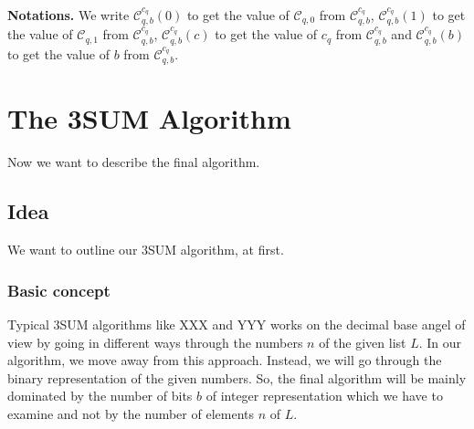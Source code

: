 \documentclass{article}
\newtheorem*{theorem A}{Theorem A}
\newtheorem*{theorem B}{N\"olker's Theorem}
\theoremstyle{remark}
\theoremstyle{remark}
\begin{document}
\textbf{Notations.} We write $\mathcal{C}^{c_{q}}_{q,b}\left(0\right)$ to get the value of $\mathcal{C}_{q,0}$ from $\mathcal{C}^{c_{q}}_{q,b}$, $\mathcal{C}^{c_{q}}_{q,b}\left(1\right)$ to get the value of $\mathcal{C}_{q,1}$ from $\mathcal{C}^{c_{q}}_{q,b}$, $\mathcal{C}^{c_{q}}_{q,b}\left(c\right)$ to get the value of $c_{q}$ from $\mathcal{C}^{c_{q}}_{q,b}$ and $\mathcal{C}^{c_{q}}_{q,b}\left(b\right)$ to get the value of $b$ from $\mathcal{C}^{c_{q}}_{q,b}$.
\section{The 3SUM Algorithm}
\label{s:the3sumalgorithm}
Now we want to describe the final algorithm.
\subsection{Idea}
\label{ss:idea}
We want to outline our 3SUM algorithm, at first.
\subsubsection{Basic concept}
\label{sss:basicconcept}
Typical 3SUM algorithms like XXX \cite{A} and YYY \cite{B} works on the decimal base angel of view by going in different ways through the numbers $n$ of the given list $L$. In our algorithm, we move away from this approach. Instead, we will go through the binary representation of the given numbers. So, the final algorithm will be mainly dominated by the number of bits $b$ of integer representation which we have to examine and not by the number of elements $n$ of $L$.\\
\end{document}
